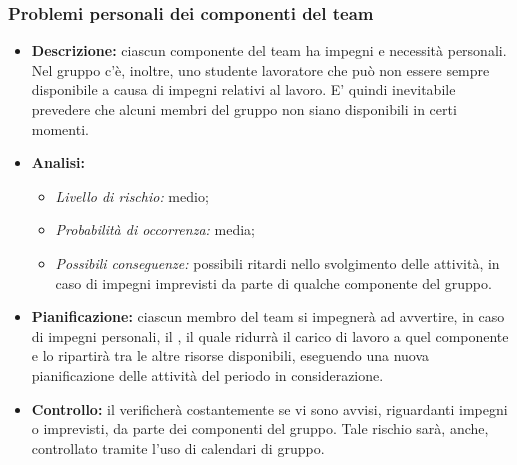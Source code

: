 		\subsubsection{Problemi personali dei componenti del team}
			\begin{itemize}
				\item \textbf{Descrizione:} ciascun componente del team ha impegni e necessità personali. Nel gruppo c'è, inoltre, uno studente lavoratore che può non essere sempre disponibile a causa di impegni relativi al lavoro. E' quindi inevitabile prevedere che alcuni membri del gruppo non siano disponibili in certi momenti.
				\item \textbf{Analisi:}
				\begin{itemize}
					\item \textit{Livello di rischio:} medio;
					\item \textit{Probabilità di occorrenza:} media;
					\item \textit{Possibili conseguenze:} possibili ritardi nello svolgimento delle attività, in caso di impegni imprevisti da parte di qualche componente del gruppo.
				\end{itemize}
				\item \textbf{Pianificazione:} ciascun membro del team si impegnerà ad avvertire, in caso di impegni personali, il , il quale ridurrà il carico di lavoro a quel componente e lo ripartirà tra le altre risorse disponibili, eseguendo una nuova pianificazione delle attività del periodo in considerazione.
				\item \textbf{Controllo:} il  verificherà costantemente se vi sono avvisi, riguardanti impegni o imprevisti, da parte dei componenti del gruppo. Tale rischio sarà, anche, controllato tramite l'uso di calendari di gruppo.
			\end{itemize}
